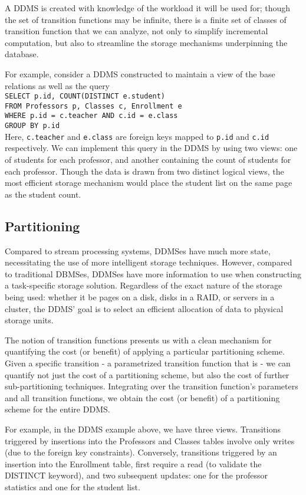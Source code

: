 A DDMS is created with knowledge of the workload it will be used for; though the set of transition functions may be infinite, there is a finite set of classes of transition function that we can analyze, not only to simplify incremental computation, but also to streamline the storage mechanisms underpinning the database.

For example, consider a DDMS constructed to maintain a view of the base relations as well as the query\texttt{\\
SELECT p.id, COUNT(DISTINCT e.student)\\
FROM Professors p, Classes c, Enrollment e\\
WHERE p.id = c.teacher AND c.id = e.class\\
GROUP BY p.id\\
}
Here, \texttt{c.teacher} and \texttt{e.class} are foreign keys mapped to \texttt{p.id} and \texttt{c.id} respectively.  We can implement this query in the DDMS by using two views: one of students for each professor, and another containing the count of students for each professor.  Though the data is drawn from two distinct logical views, the most efficient storage mechanism would place the student list on the same page as the student count.

\subsection{Partitioning}
Compared to stream processing systems, DDMSes have much more state, necessitating the use of more intelligent storage techniques.  However, compared to traditional DBMSes, DDMSes have more information to use when constructing a task-specific storage solution.  Regardless of the exact nature of the storage being used: whether it be pages on a disk, disks in a RAID, or servers in a cluster, the DDMS' goal is to select an efficient allocation of data to physical storage units.

The notion of transition functions presents us with a clean mechanism for quantifying the cost (or benefit) of applying a particular partitioning scheme.  Given a specific transition - a parametrized transition function that is - we can quantify not just the cost of a partitioning scheme, but also the cost of further sub-partitioning techniques.  Integrating over the transition function's parameters and all transition functions, we obtain the cost (or benefit) of a partitioning scheme for the entire DDMS.  

For example, in the DDMS example above, we have three views.  Transitions triggered by insertions into the Professors and Classes tables involve only writes (due to the foreign key constraints).  Conversely, transitions triggered by an insertion into the Enrollment table, first require a read (to validate the DISTINCT keyword), and two subsequent updates: one for the professor statistics and one for the student list.

